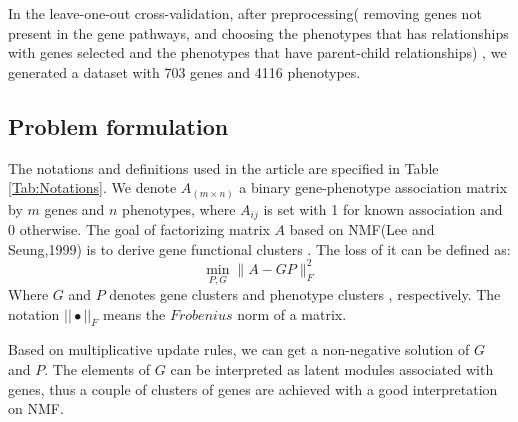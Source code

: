 \documentclass{bmcart}
\begin{document}
In the leave-one-out cross-validation, after preprocessing( removing genes not present in the gene pathways, and choosing the phenotypes that has relationships with genes selected and the phenotypes that have parent-child relationships)
, we generated a dataset with 703 genes and 4116 phenotypes.

\subsection*{\textbf{Problem formulation}}
The notations and definitions used in the article are specified in Table \ref{Tab:Notations}.
We denote $A_{(m \times n)}$ a binary gene-phenotype association matrix by $m$ genes and $n$ phenotypes, where $A_{ij}$ is set with 1 for known association and 0 otherwise. The goal of factorizing matrix $A$ based on NMF(Lee and Seung,1999) is to derive gene functional clusters . The loss of it can be defined as:
\begin{equation}\label{equ:NMF}
\mathop{min}_{{P,G}} \|A-GP\|^{2}_{F}
\end{equation}
Where $G$ and $P$ denotes gene clusters and phenotype clusters , respectively. The notation $||\bullet||_F$ means the $Frobenius$ norm of a matrix.

Based on multiplicative update rules\cite{DanielD.Lee2001}, we can get a non-negative solution of $G$ and $P$. The elements of $G$ can be interpreted as latent modules associated with genes, thus a couple of clusters of genes are achieved with a good interpretation on NMF.
\end{document}
